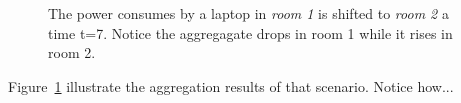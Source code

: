 \begin{figure}[htb!]
\begin{center}
\end{center}
\caption{
	The power consumes by a laptop in \emph{room 1} is shifted to \emph{room 2} a time t=7.  Notice the aggregagate drops in room 1
	while it rises in room 2.
     }%
\label{fig:multiroomagg}
\end{figure}

Figure~\ref{fig:multiroomagg} illustrate the aggregation results of that scenario.  Notice how...



